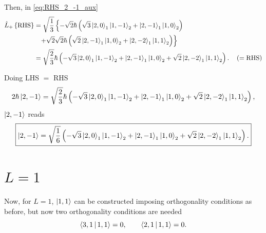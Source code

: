 Then, in \cref{eq:RHS_2_-1_aux}
\begin{align}
    \notag
    \hat{L}_{+} \left\{ \text{RHS} \right\} &=
    \sqrt{\frac{1}{3}} \left\{
        -
        \sqrt{2} \hbar \left( 
            \sqrt{3} \Ket{2,0}_1 \Ket{1,-1}_2
            +
            \Ket{2,-1}_1 \Ket{1,0}_2 
        \right)
        \right. \\
        \notag
        & \phantom{=} 
        \left.
        + \sqrt{2}
        \sqrt{2} \hbar \left( 
            \sqrt{2} \Ket{2,-1}_1 \Ket{1,0}_2 
            +
            \Ket{2,-2}_1  \Ket{1,1}_2 
        \right)
    \right\}
    \\
    &=
    \sqrt{\frac{2}{3}} \hbar
    \left(
        - \sqrt{3} \Ket{2,0}_1 \Ket{1,-1}_2
        + \Ket{2,-1}_1 \Ket{1,0}_2 
        + \sqrt{2} \Ket{2,-2}_1  \Ket{1,1}_2 
    \right).
    \quad \left( =\text{RHS} \right)
\end{align}

Doing LHS $=$ RHS 
\begin{equation}
    2 \hbar \Ket{2,-1} = 
    \sqrt{\frac{2}{3}} \hbar
    \left(
        - \sqrt{3} \Ket{2,0}_1 \Ket{1,-1}_2
        + \Ket{2,-1}_1 \Ket{1,0}_2 
        + \sqrt{2} \Ket{2,-2}_1  \Ket{1,1}_2 
    \right),
\end{equation}
$\Ket{2,-1}$ reads 
\begin{equation}
    \boxed{
        \Ket{2,-1} = 
        \sqrt{\frac{1}{6}} 
        \left(
            - \sqrt{3} \Ket{2,0}_1 \Ket{1,-1}_2
            + \Ket{2,-1}_1 \Ket{1,0}_2 
            + \sqrt{2} \Ket{2,-2}_1  \Ket{1,1}_2 
        \right).
    }
\end{equation}

\section{$L = 1$}
Now, for $L=1$, $\Ket{1,1}$ can be constructed imposing orthogonality conditions as before,
but now two orthogonality conditions are needed 
\begin{equation}\label{eq:orthog_cond_1_1_general}
    \Braket{3,1 | 1,1} = 0,
    \qquad 
    \Braket{2,1 | 1,1} = 0.
\end{equation}

